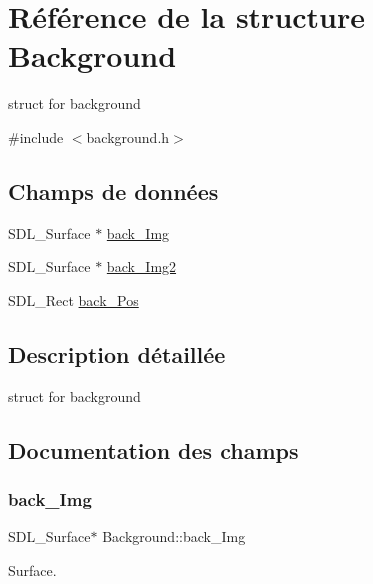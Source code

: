 \hypertarget{structBackground}{}\section{Référence de la structure Background}
\label{structBackground}


struct for background  




{\ttfamily \#include $<$background.\+h$>$}

\subsection*{Champs de données}
\begin{DoxyCompactItemize}
\item 
S\+D\+L\+\_\+\+Surface $\ast$ \hyperlink{structBackground_a13df092f4ec6aebf0364559926479761}{back\+\_\+\+Img}
\item 
S\+D\+L\+\_\+\+Surface $\ast$ \hyperlink{structBackground_a43f21e56f1aa47666ffb4afb34d71cf7}{back\+\_\+\+Img2}
\item 
S\+D\+L\+\_\+\+Rect \hyperlink{structBackground_a4921effe7d9612c8a1870bee947e4441}{back\+\_\+\+Pos}
\end{DoxyCompactItemize}


\subsection{Description détaillée}
struct for background 

\subsection{Documentation des champs}
\mbox{\label{structBackground_a13df092f4ec6aebf0364559926479761}} 
\subsubsection{\texorpdfstring{back\+\_\+\+Img}{back\_Img}}
{\footnotesize\ttfamily S\+D\+L\+\_\+\+Surface$\ast$ Background\+::back\+\_\+\+Img}

Surface. \mbox{\label{structBackground_a43f21e56f1aa47666ffb4afb34d71cf7}} 
